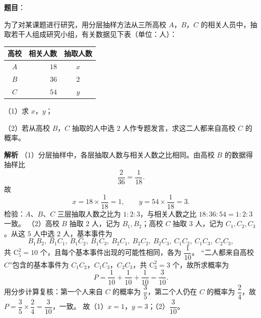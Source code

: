 \begin{answer}

\textbf{题目}：

为了对某课题进行研究，用分层抽样方法从三所高校 $A$，$B$，$C$ 的相关人员中，抽取若干人组成研究小组，有关数据见下表（单位：人）：

\begin{center}
\begin{tabular}{crc}
\toprule
高校 & 相关人数 & 抽取人数 \\
\midrule
$A$ & $18$ & $x$ \\
$B$ & $36$ & $2$ \\
$C$ & $54$ & $y$ \\
\bottomrule
\end{tabular}
\end{center}

（1）求 $x$，$y$；

（2）若从高校 $B$，$C$ 抽取的人中选 $2$ 人作专题发言，求这二人都来自高校 $C$ 的概率。

\textbf{解析}
（1）分层抽样中，各层抽取人数与相关人数之比相同。由高校 $B$ 的数据得抽样比
\nopagebreak[4]
\[\frac{2}{36}=\frac{1}{18}.\]
故
\nopagebreak[4]
\[x=18\times\frac1{18}=1,\qquad y=54\times\frac1{18}=3.\]
检验：$A$、$B$、$C$ 三层抽取人数之比为 $1:2:3$，与相关人数之比 $18:36:54=1:2:3$ 一致。
（2）高校 $B$ 抽取 $2$ 人，记为 $B_1,B_2$；高校 $C$ 抽取 $3$ 人，记为 $C_1,C_2,C_3$。从这 $5$ 人中选 $2$ 人，基本事件为
\nopagebreak[4]
\[B_1B_2,\ B_1C_1,\ B_1C_2,\ B_1C_3,\ B_2C_1,\ B_2C_2,\ B_2C_3,\ C_1C_2,\ C_1C_3,\ C_2C_3,\]
共 $\mathrm C_5^2=10$ 个，且每个基本事件出现的可能性相同，各为 $\dfrac1{10}$。
“二人都来自高校 $C$”包含的基本事件为 $C_1C_2$，$C_1C_3$，$C_2C_3$，共 $\mathrm C_3^2=3$ 个，故所求概率为
\nopagebreak[4]
\[P=\frac1{10}+\frac1{10}+\frac1{10}=\frac3{10}.\]
用分步计算复核：第一个人来自 $C$ 的概率为 $\dfrac35$，第二个人仍在 $C$ 的概率为 $\dfrac24$，故 $P=\dfrac35\times\dfrac24=\dfrac3{10}$，一致。
故（1）$x=1$，$y=3$；（2）$\dfrac3{10}$。


\end{answer}
